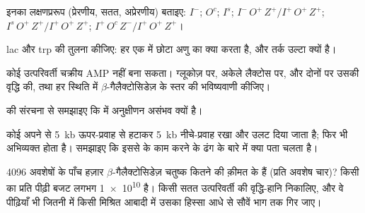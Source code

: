 \begin{exercise}[$\star\star$]\label{exo:b1:expression-control:5}
इनका लक्षणप्ररूप (प्रेरणीय, सतत, अप्रेरणीय) बताइए: $I^-$;
$O^c$; $I^s$; $I^-\,O^+\,Z^+ / I^+\,O^+\,Z^+$; $I^s\,O^+\,Z^+ /
I^+\,O^+\,Z^+$; $I^+\,O^c\,Z^- / I^+\,O^+\,Z^+$।
\end{exercise}

\begin{exercise}[$\star\star$]\label{exo:b1:expression-control:6}
lac और trp  की तुलना कीजिए: हर एक में छोटा अणु  का क्या
करता है, और तर्क उल्टा क्यों है।
\end{exercise}

\begin{exercise}[$\star\star$]\label{exo:b1:expression-control:7}
कोई उत्परिवर्ती चक्रीय AMP नहीं बना सकता। ग्लूकोज़ पर, अकेले लैक्टोस पर,
और दोनों पर उसकी वृद्धि की, तथा हर स्थिति में
$\beta$-गैलैक्टोसिडेज़ के स्तर की भविष्यवाणी कीजिए।
\end{exercise}

\begin{exercise}[$\star\star$]\label{exo:b1:expression-control:8}
 की संरचना से समझाइए कि  में अनुक्षीणन
असंभव क्यों है।
\end{exercise}

\begin{exercise}[$\star\star$]\label{exo:b1:expression-control:9}
कोई  अपने  से \qty{5}{kb} ऊपर-प्रवाह से हटाकर
\qty{5}{kb} नीचे-प्रवाह रखा और उलट दिया जाता है; फिर भी  अभिव्यक्त
होता है। समझाइए कि इससे  के काम करने के ढंग के बारे में क्या
पता चलता है।
\end{exercise}

\begin{exercise}[$\star\star\star$]\label{exo:b1:expression-control:10}
\qty{4096}{} अवशेषों के पाँच हज़ार $\beta$-गैलैक्टोसिडेज़ चतुष्क कितने
 की क़ीमत के हैं (प्रति अवशेष चार)? किसी  का प्रति पीढ़ी बजट
लगभग \qty{1e10}{}  है। किसी सतत उत्परिवर्ती की वृद्धि-हानि
निकालिए, और वे पीढ़ियाँ भी जितनी में किसी मिश्रित आबादी में उसका हिस्सा
आधे से सौवें भाग तक गिर जाए।
\end{exercise}

